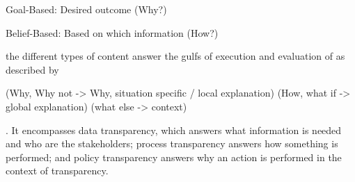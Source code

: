 Goal-Based: Desired outcome (Why?) \cite{kaptein_personalised_2017, abdulrahman_belief-based_2019}

Belief-Based: Based on which information (How?) \cite{kaptein_personalised_2017, abdulrahman_belief-based_2019}

the different types of content answer the gulfs of execution and evaluation of \cite{norman1988psychology} as described by \cite{ribera2019can}

(Why, Why not -> Why, situation specific / local explanation) (How, what if -> global explanation) (what else -> context) \cite{lim_2009_assessing}

. It encompasses data transparency, which answers what information is needed and who are the stakeholders; process transparency answers how something is performed; and policy transparency answers why an action is performed in the context of transparency. \cite{chazette2020explainability}

